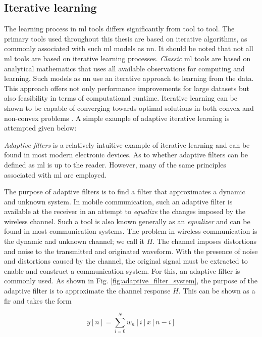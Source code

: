\subsection{Iterative learning}
The learning process in \gls{ml} tools differs significantly from tool to tool. The primary tools used throughout this thesis are based on iterative algorithms, as commonly associated with such \gls{ml} models as \gls{nn}. It should be noted that not all \gls{ml} tools are based on iterative learning processes. \emph{Classic} \gls{ml} tools are based on analytical mathematics that uses all available observations for computing and learning. Such models as \gls{nn} use an iterative approach to learning from the data. This approach offers not only performance improvements for large datasets but also feasibility in terms of computational runtime. Iterative learning can be shown to be capable of converging towards optimal solutions in both convex and non-convex problems \cite{M.Bishop2006}. A simple example of adaptive iterative learning is attempted given below:

\emph{Adaptive filters} is a relatively intuitive example of iterative learning and can be found in most modern electronic devices. As to whether adaptive filters can be defined as \gls{ml} is up to the reader. However, many of the same principles associated with \gls{ml} are employed. 

The purpose of adaptive filters is to find a filter that approximates a dynamic and unknown system. In mobile communication, such an adaptive filter is available at the receiver in an attempt to \emph{equalize} the changes imposed by the wireless channel. Such a tool is also known generally as an \emph{equalizer} and can be found in most communication systems. The problem in wireless communication is the dynamic and unknown channel; we call it $H$. The channel imposes distortions and noise to the transmitted and originated waveform. With the presence of noise and distortions caused by the channel, the original signal must be extracted to enable and construct a communication system. For this, an adaptive filter is commonly used.  As shown in Fig. \ref{fig:adaptive_filter_system}, the purpose of the adaptive filter is to approximate the channel response $H$. This can be shown as a \gls{fir} and takes the form 

\begin{equation}\label{eq:fir}
    y[n] = \sum_{i=0}^N w_n[i]x[n-i]
\end{equation}

